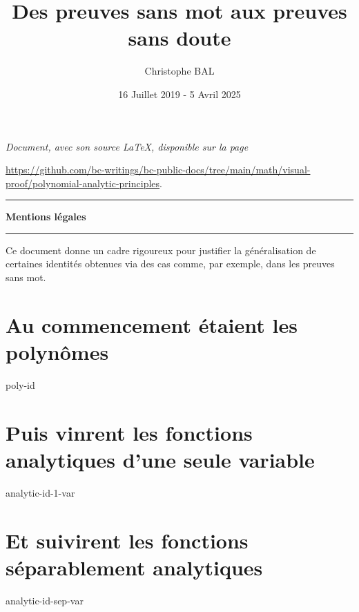 \documentclass[12pt]{amsart}
\begin{document}
\title{Des preuves sans mot aux preuves sans doute}
\author{Christophe BAL}
\date{16 Juillet 2019 - 5 Avril 2025}

\maketitle

\begin{center}
	\itshape
	Document, avec son source \LaTeX, disponible sur la page

	\url{https://github.com/bc-writings/bc-public-docs/tree/main/math/visual-proof/polynomial-analytic-principles}.
\end{center}


\bigskip


\begin{center}
	\hrule\vspace{.3em}
	{
		\fontsize{1.35em}{1em}\selectfont
		\textbf{Mentions \og légales \fg}
	}

	\vspace{0.45em}
	\doclicenseThis
	\hrule
\end{center}


\bigskip


\setcounter{tocdepth}{1}
\tableofcontents



\newpage

\begin{meta-abstract*}
	Ce document donne un cadre rigoureux pour justifier la généralisation de certaines identités obtenues via des cas  comme, par exemple, dans les preuves sans mot. 
\end{meta-abstract*}




\section{Au commencement étaient les polynômes}

{poly-id}




\section{Puis vinrent les fonctions analytiques d'une seule variable}

{analytic-id-1-var}




\section{Et suivirent les fonctions séparablement analytiques}

{analytic-id-sep-var}
\end{document}
